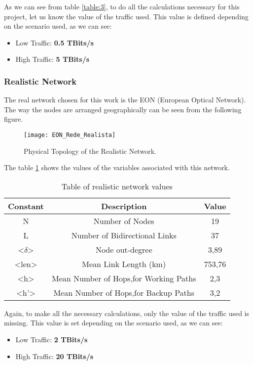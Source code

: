 As we can see from table \ref{table:3}, to do all the calculations necessary for this project, let us know the value of the traffic used. This value is defined depending on the scenario used, as we can see:
\begin{itemize}
  \item Low Traffic: \textbf{0.5 TBits/s}
  \item High Traffic: \textbf{5 TBits/s}
\end{itemize}

\subsubsection{Realistic Network}
The real network chosen for this work is the EON (European Optical Network).
The way the nodes are arranged geographically can be seen from the following figure.

\begin{figure}[h!]
\centering
\texttt{[image: EON\_Rede\_Realista]}
\caption{Physical Topology of the Realistic Network.}
\end{figure}

\begin{table}[h!]
The table \ref{table:4} shows the values of the variables associated with this network.\vspace{10pt}
\centering
\begin{tabular}{|| c | c | c||}
 \hline
 Constant & Description & Value \\
 \hline\hline
 N & Number of Nodes & 19 \\
 L & Number of Bidirectional Links & 37 \\
 <$\delta$> & Node out-degree & 3,89 \\
 <len> & Mean Link Length (km) & 753,76 \\
 <h> & Mean Number of Hops,for Working Paths & 2,3 \\
 <h'> & Mean Number of Hops,for Backup Paths & 3,2 \\
 \hline
\end{tabular}
\caption{Table of realistic network values}
\label{table:4}
\end{table}

Again, to make all the necessary calculations, only the value of the traffic used is missing. This value is set depending on the scenario used, as we can see:

\begin{itemize}
  \item Low Traffic: \textbf{2 TBits/s}
  \item High Traffic: \textbf{20 TBits/s}
\end{itemize}

